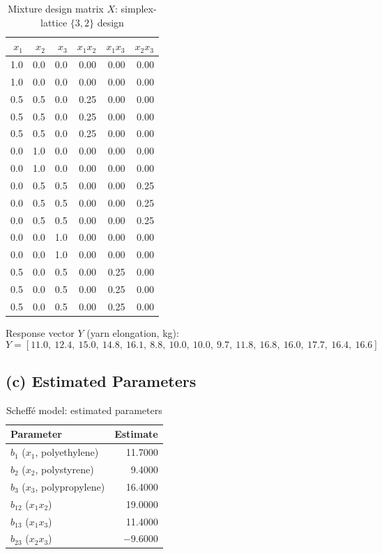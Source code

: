 \documentclass[12pt,a4paper]{article}
\begin{document}
\begin{table}[H]
\centering
\caption{Mixture design matrix $X$: simplex-lattice $\{3,2\}$ design}
\begin{tabular}{rrrrrr}
\toprule
$x_1$ & $x_2$ & $x_3$ & $x_1 x_2$ & $x_1 x_3$ & $x_2 x_3$ \\
\midrule
1.0 & 0.0 & 0.0 & 0.00 & 0.00 & 0.00 \\
1.0 & 0.0 & 0.0 & 0.00 & 0.00 & 0.00 \\
0.5 & 0.5 & 0.0 & 0.25 & 0.00 & 0.00 \\
0.5 & 0.5 & 0.0 & 0.25 & 0.00 & 0.00 \\
0.5 & 0.5 & 0.0 & 0.25 & 0.00 & 0.00 \\
0.0 & 1.0 & 0.0 & 0.00 & 0.00 & 0.00 \\
0.0 & 1.0 & 0.0 & 0.00 & 0.00 & 0.00 \\
0.0 & 0.5 & 0.5 & 0.00 & 0.00 & 0.25 \\
0.0 & 0.5 & 0.5 & 0.00 & 0.00 & 0.25 \\
0.0 & 0.5 & 0.5 & 0.00 & 0.00 & 0.25 \\
0.0 & 0.0 & 1.0 & 0.00 & 0.00 & 0.00 \\
0.0 & 0.0 & 1.0 & 0.00 & 0.00 & 0.00 \\
0.5 & 0.0 & 0.5 & 0.00 & 0.25 & 0.00 \\
0.5 & 0.0 & 0.5 & 0.00 & 0.25 & 0.00 \\
0.5 & 0.0 & 0.5 & 0.00 & 0.25 & 0.00 \\
\bottomrule
\end{tabular}
\end{table}

Response vector $Y$ (yarn elongation, kg):
\[
  Y = [11.0,\ 12.4,\ 15.0,\ 14.8,\ 16.1,\ 8.8,\ 10.0,\ 10.0,\
       9.7,\ 11.8,\ 16.8,\ 16.0,\ 17.7,\ 16.4,\ 16.6]
\]

\subsection{(c) Estimated Parameters}

\begin{table}[H]
\centering
\caption{Scheff\'{e} model: estimated parameters}
\begin{tabular}{lr}
\toprule
Parameter & Estimate \\
\midrule
$b_1$  ($x_1$, polyethylene)   &  11.7000 \\
$b_2$  ($x_2$, polystyrene)    &   9.4000 \\
$b_3$  ($x_3$, polypropylene)  &  16.4000 \\
$b_{12}$ ($x_1 x_2$)           &  19.0000 \\
$b_{13}$ ($x_1 x_3$)           &  11.4000 \\
$b_{23}$ ($x_2 x_3$)           & $-9.6000$ \\
\bottomrule
\end{tabular}
\end{table}
\end{document}
